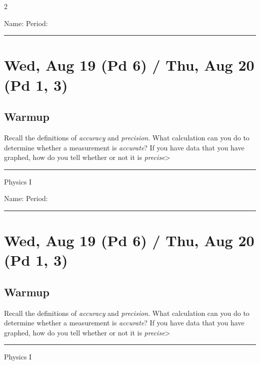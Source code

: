 \documentclass[10pt,landscape]{exam}
\def\todayDate{Wed, Aug 19 (Pd 6) / Thu, Aug 20 (Pd 1, 3)}
\def\content{
\begin{questions}
  \question 
    Recall the definitions of \emph{accuracy} and \emph{precision}. \vs 
  \question 
    What calculation can you do to determine whether a measurement is \emph{accurate}? \vs
  \question
    If you have data that you have graphed, how do you tell whether or not it is \emph{precise}> \vs 
\end{questions}
}
\begin{document}
\pagestyle{empty}

\setlength{\columnsep}{0.8in}
\begin{multicols*}{2}

\noindent  
Name: \hfill Period: \hspace{5em}
\vspace{0.5em}
\hrule

\section*{\todayDate}
\subsection*{Warmup}

\content

\vfill
\hrule
\vspace{0.5em}
\hfill {\sc Physics I}

\columnbreak

\noindent  
Name: \hfill Period: \hspace{5em}
\vspace{0.5em}
\hrule

\section*{\todayDate}
\subsection*{Warmup}

\content

\vfill
\hrule
\vspace{0.5em}
\hfill {\sc Physics I}

\end{multicols*}
\end{document}
